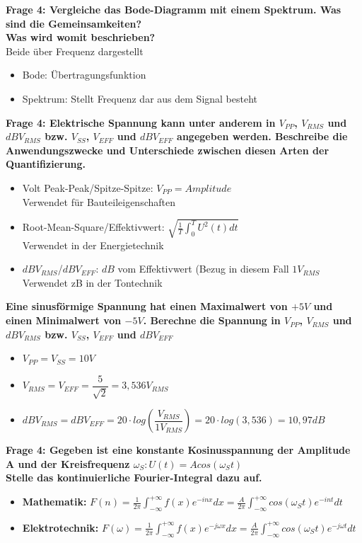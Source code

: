 \documentclass[11pt,a4paper]{scrartcl}
\begin{document}
\textbf{Frage 4: Vergleiche das Bode-Diagramm mit einem Spektrum. Was sind die Gemeinsamkeiten?}\\
\textbf{Was wird womit beschrieben?}\\
Beide über Frequenz dargestellt
\begin{itemize}
	\item Bode: Übertragungsfunktion
	\item Spektrum: Stellt Frequenz dar aus dem Signal besteht
\end{itemize}

\textbf{Frage 4: Elektrische Spannung kann unter anderem in $V_{PP}$, $V_{RMS}$ und $dBV_{RMS}$ bzw. $V_{SS}$, $V_{EFF}$ und $dBV_{EFF}$ angegeben werden. Beschreibe die Anwendungszwecke und Unterschiede zwischen diesen Arten der Quantifizierung.}\\
\begin{itemize}
	\item Volt Peak-Peak/Spitze-Spitze: $V_{PP}=Amplitude$ \\Verwendet für Bauteileigenschaften
	\item Root-Mean-Square/Effektivwert: $\sqrt{\frac{1}{T}\int_0^TU^2(t)dt}$ \\Verwendet in der Energietechnik
	\item $dBV_{RMS}$/$dBV_{EFF}$: $dB$ vom Effektivwert (Bezug in diesem Fall $1V_{RMS}$ \\Verwendet zB in der Tontechnik
\end{itemize}
\textbf{Eine sinusförmige Spannung hat einen Maximalwert von $+5V$ und einen
Minimalwert von $-5V$. Berechne die Spannung in $V_{PP}$, $V_{RMS}$ und $dBV_{RMS}$ bzw. $V_{SS}$, $V_{EFF}$ und $dBV_{EFF}$}\\
\begin{itemize}
	\item $V_{PP}=V_{SS}=10V$
	\item $V_{RMS}=V_{EFF}=\dfrac{5}{\sqrt{2}}=3,536V_{RMS}$
	\item $dBV_{RMS}=dBV_{EFF}=20\cdot log(\dfrac{V_{RMS}}{1V_{RMS}})=20\cdot log(3,536)=10,97dB$
\end{itemize}

\textbf{Frage 4: Gegeben ist eine konstante Kosinusspannung der Amplitude A und der Kreisfrequenz $\omega_S : U(t) = A cos (\omega_St)$\\Stelle das kontinuierliche Fourier-Integral dazu auf. }
\begin{itemize}
	\item \textbf{Mathematik:} $F(n)=\frac{1}{2\pi}\int_{-\infty}^{+\infty}f(x)e^{-inx}dx=\frac{A}{2\pi}\int_{-\infty}^{+\infty}cos(\omega_St)e^{-int}dt$
	\item \textbf{Elektrotechnik:} $F(\omega)=\frac{1}{2\pi}\int_{-\infty}^{+\infty}f(x)e^{-j\omega x}dx=\frac{A}{2\pi}\int_{-\infty}^{+\infty}cos(\omega_St)e^{-j \omega t}dt$
\end{itemize}
\end{document}
